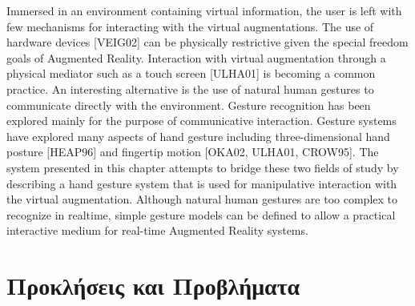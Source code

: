 Immersed in an environment containing virtual information, the user is left with few mechanisms for interacting with the virtual augmentations. The use of hardware devices [VEIG02] can be physically restrictive given the special freedom goals of Augmented Reality. Interaction with virtual augmentation through a physical mediator such as a touch screen [ULHA01] is becoming a common practice. An interesting alternative is the use of natural human gestures to communicate directly with the environment. Gesture recognition has been explored mainly for the purpose of communicative interaction. Gesture systems have explored many aspects of hand gesture including three-dimensional hand posture [HEAP96] and fingertip motion [OKA02, ULHA01, CROW95]. The system presented in this chapter attempts to bridge these two fields of study by describing a hand gesture system that is used for manipulative interaction with the virtual augmentation. Although natural human gestures are too complex to recognize in realtime, simple gesture models can be defined to allow a practical interactive medium for real-time Augmented Reality systems.



\section{Προκλήσεις και Προβλήματα}

